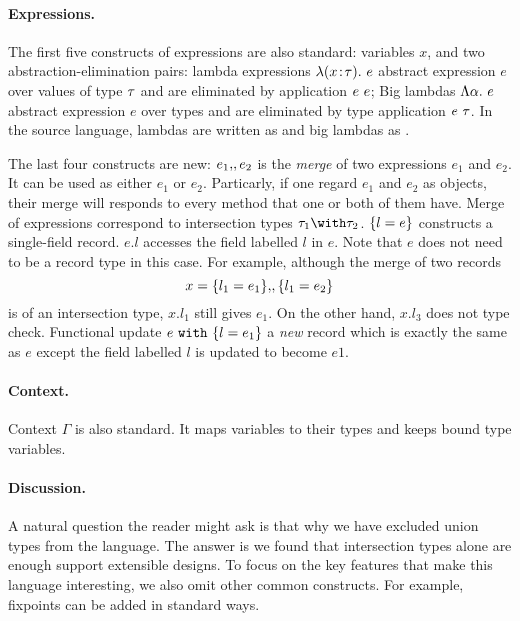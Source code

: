 \paragraph{Expressions.} The first five constructs of expressions are also
standard: variables $ x $, and two abstraction-elimination pairs: lambda
expressions $ \lambda (x \!:\! \tau).~ e $ abstract expression $ e $ over values of
type $ \tau $ and are eliminated by application $ {e} ~ {e} $; Big lambdas
$ \Lambda \alpha.~ e $ abstract expression $ e $ over types and are eliminated by
type application $ {e} ~ {\tau} $. In the source language, lambdas are written as
 and big lambdas as .

The last four constructs are new: $ e_1 ,\!, e_2 $ is the \emph{merge} of two
expressions $ e_1 $ and $ e_2 $.
It can be used as either $ e_1 $ or $ e_2 $. Particarly, if one regard $ e_1 $
and $ e_2 $ as objects, their merge will responds to every method that one or
both of them have. Merge of expressions correspond to intersection types
$ \ty_1 \intersects \ty_2 $. $ \{ l = e \} $ constructs a single-field record.
$ e.l $ accesses the field labelled $ l $ in $ e $. Note that $ e $ does not
need to be a record type in this case. For example, although the merge of two
records
\[
x = \{ l_1 = e_1 \} ,\!, \{ l_1 = e_2 \} 
\]
is of an intersection type, $ x.{l_1} $ still gives $ e_1 $. On the other hand,
$ x.{l_3} $ does not type check. Functional update $ e ~ \texttt{with} ~ \{ l = e_1 \} $ a
\emph{new} record which is exactly the same as $ e $ except the field labelled
$ l $ is updated to become $ e1 $.

\paragraph{Context.} Context $ \Gamma $ is also standard. It maps variables to
their types and keeps bound type variables.

\paragraph{Discussion.} A natural question the reader might ask is that why we
have excluded union types from the language. The answer is we found that
intersection types alone are enough support extensible designs. To focus on the
key features that make this language interesting, we also omit other common
constructs. For example, fixpoints can be added in standard ways.

